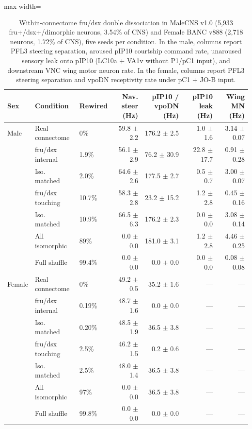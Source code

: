 \documentclass[11pt,a4paper]{article}
\begin{document}
\begin{table}[t]
\centering\small
\caption{Within-connectome fru/dsx double dissociation in MaleCNS v1.0 (5,933 fru+/dsx+/dimorphic neurons, 3.54\% of CNS) and Female BANC v888 (2,718 neurons, 1.72\% of CNS), five seeds per condition. In the male, columns report PFL3 steering separation, aroused pIP10 courtship command rate, unaroused sensory leak onto pIP10 (LC10a + VA1v without P1/pC1 input), and downstream VNC wing motor neuron rate. In the female, columns report PFL3 steering separation and vpoDN receptivity rate under pC1 + JO-B input.}\label{tbl:sexswitch}
\begin{adjustbox}{max width=\textwidth}
\begin{tabular}{lllrrrr}
\toprule
Sex & Condition & Rewired & Nav. steer (Hz) & pIP10 / vpoDN (Hz) & pIP10 leak (Hz) & Wing MN (Hz) \\
\midrule
Male & Real connectome & 0\% & 59.8 $\pm$ 2.2 & 176.2 $\pm$ 2.5 & 1.0 $\pm$ 1.6 & 3.14 $\pm$ 0.07 \\
\midrule
 & fru/dsx internal & 1.9\% & 56.1 $\pm$ 2.9 & 76.2 $\pm$ 30.9 & 22.8 $\pm$ 17.7 & 0.91 $\pm$ 0.28 \\
 & Iso. matched & 2.0\% & 64.6 $\pm$ 2.6 & 177.5 $\pm$ 2.7 & 0.5 $\pm$ 0.7 & 3.00 $\pm$ 0.07 \\
\midrule
 & fru/dsx touching & 10.7\% & 58.3 $\pm$ 2.8 & 23.2 $\pm$ 15.2 & 1.2 $\pm$ 2.8 & 0.45 $\pm$ 0.16 \\
 & Iso. matched & 10.9\% & 66.5 $\pm$ 6.3 & 176.2 $\pm$ 2.3 & 0.0 $\pm$ 0.0 & 3.08 $\pm$ 0.14 \\
\midrule
 & All isomorphic & 89\% & 0.0 $\pm$ 0.0 & 181.0 $\pm$ 3.1 & 1.2 $\pm$ 2.8 & 4.46 $\pm$ 0.25 \\
 & Full shuffle & 99.4\% & 0.0 $\pm$ 0.0 & 0.0 $\pm$ 0.0 & 0.0 $\pm$ 0.0 & 0.08 $\pm$ 0.08 \\
\midrule
Female & Real connectome & 0\% & 49.2 $\pm$ 0.5 & 35.2 $\pm$ 1.6 & --- & --- \\
 & fru/dsx internal & 0.19\% & 48.7 $\pm$ 1.6 & 0.0 $\pm$ 0.0 & --- & --- \\
 & Iso. matched & 0.20\% & 48.5 $\pm$ 1.9 & 36.5 $\pm$ 3.8 & --- & --- \\
 & fru/dsx touching & 2.5\% & 46.2 $\pm$ 1.5 & 0.2 $\pm$ 0.6 & --- & --- \\
 & Iso. matched & 2.5\% & 48.0 $\pm$ 1.4 & 36.5 $\pm$ 3.8 & --- & --- \\
 & All isomorphic & 97\% & 0.0 $\pm$ 0.0 & 36.5 $\pm$ 3.8 & --- & --- \\
 & Full shuffle & 99.8\% & 0.0 $\pm$ 0.0 & 0.0 $\pm$ 0.0 & --- & --- \\
\bottomrule
\end{tabular}
\end{adjustbox}
\end{table}
\end{document}

